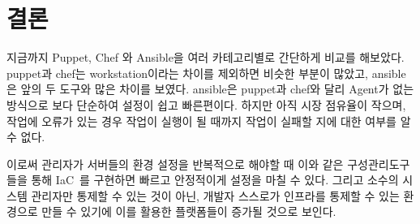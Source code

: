 \documentclass{pnu-survey}
\begin{document}
\section{결론}
지금까지 Puppet, Chef 와 Ansible을 여러 카테고리별로 간단하게 비교를 해보았다. puppet과 chef는 workstation이라는 차이를 제외하면 비슷한 부분이 많았고, ansible은 앞의 두 도구와 많은 차이를 보였다. ansible은 puppet과 chef와 달리 Agent가 없는 방식으로 보다 단순하여 설정이 쉽고 빠른편이다. 하지만 아직 시장 점유율이 작으며, 작업에 오류가 있는 경우 작업이 실행이 될 때까지 작업이 실패할 지에 대한 여부를 알 수 없다.

이로써 관리자가 서버들의 환경 설정을 반복적으로 해야할 때 이와 같은 구성관리도구들을 통해 IaC~\cite{iac}를 구현하면 빠르고 안정적이게 설정을 마칠 수 있다. 그리고 소수의 시스템 관리자만 통제할 수 있는 것이 아닌, 개발자 스스로가 인프라를 통제할 수 있는 환경으로 만들 수 있기에 이를 활용한 플랫폼들이 증가될 것으로 보인다. 



\end{document}
